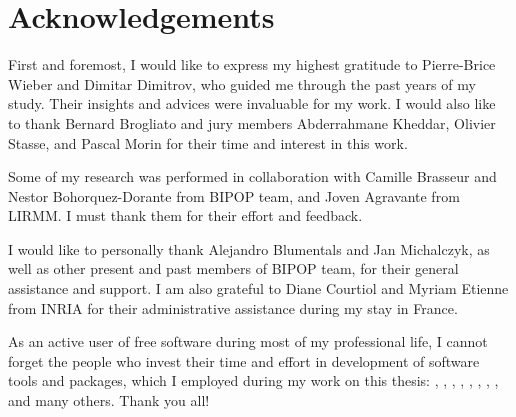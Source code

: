 \clearpage
{}
{}
\chapter*{Acknowledgements}

First and foremost, I would like to express my highest gratitude to
Pierre-Brice Wieber and Dimitar Dimitrov, who guided me through the past years
of my study. Their insights and advices were invaluable for my work. I would
also like to thank Bernard Brogliato and jury members Abderrahmane Kheddar,
Olivier Stasse, and Pascal Morin for their time and interest in this work.


Some of my research was performed in collaboration with Camille Brasseur and
Nestor Bohorquez-Dorante from BIPOP team, and Joven Agravante from LIRMM. I
must thank them for their effort and feedback.


I would like to personally thank Alejandro Blumentals and Jan Michalczyk, as
well as other present and past members of BIPOP team, for their general
assistance and support. I am also grateful to Diane Courtiol and Myriam Etienne
from INRIA for their administrative assistance during my stay in France.


As an active user of free software during most of my professional life, I
cannot forget the people who invest their time and effort in development of
software tools and packages, which I employed during my work on this thesis:
,
,
,
,
,
,
,
,
and many others. Thank you all!


\clearpage
{}
{}
\setcounter{tocdepth}{2}
\tableofcontents

\clearpage
{}
{}
\listoffigures



\clearpage
{}
{}


\printacronyms
{}
